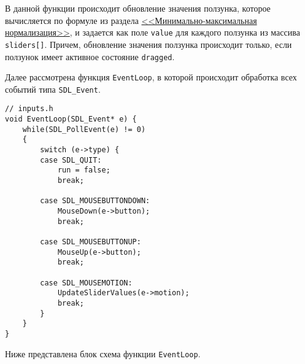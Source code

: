\documentclass[14pt]{extarticle}
\begin{document}
{\begin{center}
    \end{center}

    \begin{spacing}{1.5}
        В данной функции происходит обновление значения ползунка, которое вычисляется по формуле из раздела \hyperref[sec:minmaxnorm]{<<Минимально-максимальная нормализация>>}, и задается как поле \verb|value| для каждого ползунка из массива \verb|sliders[]|. Причем, обновление значения ползунка происходит только, если ползунок имеет активное состояние \verb|dragged|.
        \label{sec:eventloop}
        \par
        Далее рассмотрена функция \verb|EventLoop|, в которой происходит обработка всех событий типа \verb|SDL_Event|.
    \end{spacing}

    \begin{lstlisting}
// inputs.h
void EventLoop(SDL_Event* e) {
    while(SDL_PollEvent(e) != 0)
    {
    	switch (e->type) {
    	case SDL_QUIT:
    		run = false;
    		break;

    	case SDL_MOUSEBUTTONDOWN:
    		MouseDown(e->button);
    		break;

    	case SDL_MOUSEBUTTONUP:
    		MouseUp(e->button);
    		break;

    	case SDL_MOUSEMOTION:
    		UpdateSliderValues(e->motion);
    		break;
    	}
	}
}\end{lstlisting}

    \begin{spacing}{1.5}
        \noindent
        Ниже представлена блок схема функции \verb|EventLoop|.
    \end{spacing}

    \vspace{-0.5em}

}
\end{document}
